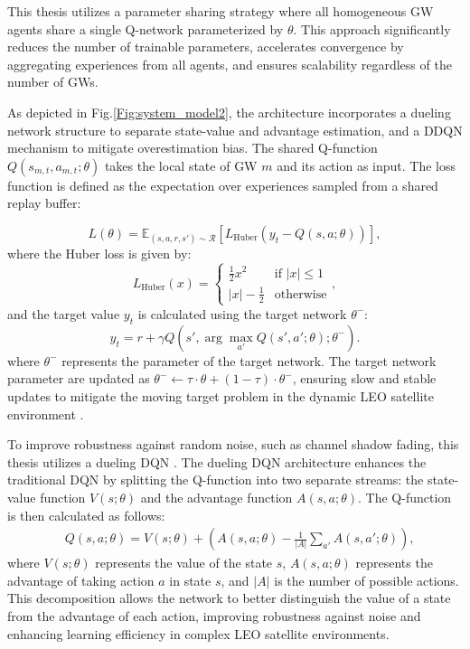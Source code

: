 This thesis utilizes a parameter sharing strategy where all homogeneous GW agents share a single Q-network parameterized by $\theta$. This approach significantly reduces the number of trainable parameters, accelerates convergence by aggregating experiences from all agents, and ensures scalability regardless of the number of GWs.

As depicted in Fig.\ref{Fig:system_model2}, the architecture incorporates a dueling network structure to separate state-value and advantage estimation, and a DDQN mechanism to mitigate overestimation bias. The shared Q-function $Q(s_{m,t}, a_{m,t}; \theta)$ takes the local state of GW $m$ and its action as input. The loss function is defined as the expectation over experiences sampled from a shared replay buffer:

\begin{equation}
L(\theta) = \mathbb{E}_{(s,a,r,s') \sim \mathcal{R}} \left[ L_{\text{Huber}}(y_t - Q(s, a; \theta)) \right],
\label{eq:loss}
\end{equation}
where the Huber loss is given by:
\begin{equation}
L_{\text{Huber}}(x) = \begin{cases} 
\frac{1}{2} x^2 & \text{if } |x| \leq 1 \\
|x| - \frac{1}{2} & \text{otherwise}
\end{cases},
\end{equation}
and the target value $y_t$ is calculated using the target network $\theta^{-}$:
\begin{equation}
y_t = r + \gamma Q(s', \arg\max_{a'} Q(s', a'; \theta); \theta^{-}).
\label{eq:ddqn_target}
\end{equation}
where \( \theta^- \) represents the parameter of the target network. The target network parameter are updated as \( \theta^- \leftarrow \tau \cdot \theta + (1 - \tau) \cdot \theta^- \), ensuring slow and stable updates to mitigate the moving target problem in the dynamic LEO satellite environment \cite{hazan2019revisiting}.

To improve robustness against random noise, such as channel shadow fading, this thesis utilizes a dueling DQN \cite{wang2016dueling}. The dueling DQN architecture enhances the traditional DQN by splitting the Q-function into two separate streams: the state-value function \( V(s; \theta) \) and the advantage function \( A(s, a; \theta) \). The Q-function is then calculated as follows:
\begin{align}
& Q(s, a; \theta) = V(s; \theta) + \left( A(s, a; \theta) - \frac{1}{|A|} \sum_{a'} A(s, a'; \theta) \right),
\label{eq:dueling_q}
\end{align}
where \( V(s; \theta) \) represents the value of the state \( s \), \( A(s, a; \theta) \) represents the advantage of taking action \( a \) in state \( s \), and \( |A| \) is the number of possible actions. This decomposition allows the network to better distinguish the value of a state from the advantage of each action, improving robustness against noise and enhancing learning efficiency in complex LEO satellite environments.

